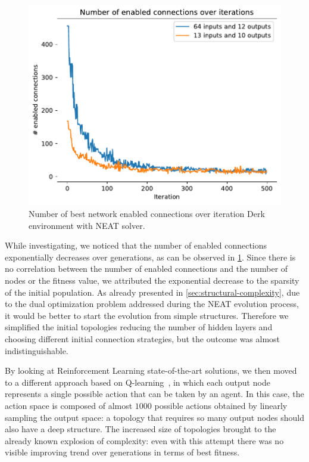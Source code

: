 \begin{figure}
    \centering
    \includegraphics[width=0.8\linewidth]{./images/n_enabled_connections_over_iterations_derk_neat.pdf}
    \caption{Number of best network enabled connections over iteration Derk environment with NEAT solver.}
    \label{fig:enabled-connection-iteration-derk-neat}
\end{figure}

While investigating, we noticed that the number of enabled connections exponentially decreases over generations, as can be observed in \cref{fig:enabled-connection-iteration-derk-neat}. 
Since there is no correlation between the number of enabled connections and the number of nodes or the fitness value, we attributed the exponential decrease to the sparsity of the initial population. As already presented in \cref{sec:structural-complexity}, due to the dual optimization problem addressed during the NEAT evolution process, it would be better to start the evolution from simple structures. Therefore we simplified the initial topologies reducing the number of hidden layers and choosing different initial connection strategies, but the outcome was almost indistinguishable.

By looking at Reinforcement Learning state-of-the-art solutions, we then moved to a different approach based on Q-learning~\cite{DEEPQL}, in which each output node represents a single possible action that can be taken by an agent. In this case, the action space is composed of almost $1000$ possible actions obtained by linearly sampling the output space: a topology that requires so many output nodes should also have a deep structure. The increased size of topologies brought to the already known explosion of complexity: even with this attempt there was no visible improving trend over generations in terms of best fitness.

